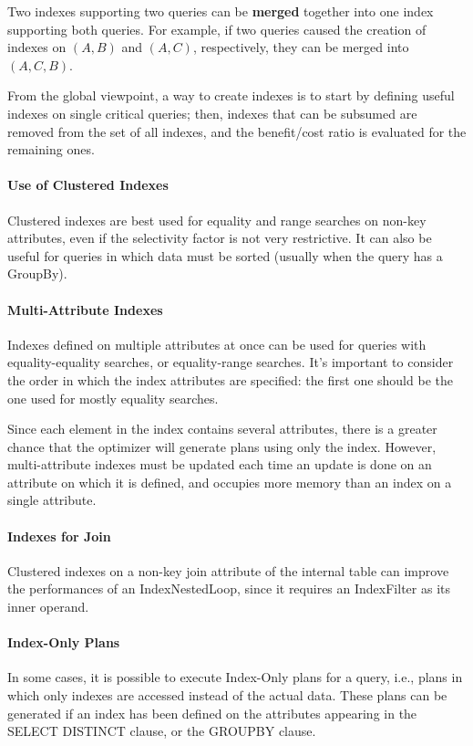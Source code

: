 Two indexes supporting two queries can be \textbf{merged} together into one index supporting both queries. For example, if two queries caused the creation of indexes on $(A, B)$ and $(A, C)$, respectively, they can be merged into $(A, C, B)$.

From the global viewpoint, a way to create indexes is to start by defining useful indexes on single critical queries; then, indexes that can be subsumed are removed from the set of all indexes, and the benefit/cost ratio is evaluated for the remaining ones.

\paragraph{Use of Clustered Indexes} Clustered indexes are best used for equality and range searches on non-key attributes, even if the selectivity factor is not very restrictive. It can also be useful for queries in which data must be sorted (usually when the query has a GroupBy).

\paragraph{Multi-Attribute Indexes} Indexes defined on multiple attributes at once can be used for queries with equality-equality searches, or equality-range searches. It's important to consider the order in which the index attributes are specified: the first one should be the one used for mostly equality searches.

Since each element in the index contains several attributes, there is a greater chance that the optimizer will generate plans using only the index. However, multi-attribute indexes must be updated each time an update is done on an attribute on which it is defined, and occupies more memory than an index on a single attribute.

\paragraph{Indexes for Join} Clustered indexes on a non-key join attribute of the internal table can improve the performances of an IndexNestedLoop, since it requires an IndexFilter as its inner operand.

\paragraph{Index-Only Plans} In some cases, it is possible to execute Index-Only plans for a query, i.e., plans in which only indexes are accessed instead of the actual data. These plans can be generated if an index has been defined on the attributes appearing in the SELECT DISTINCT clause, or the GROUPBY clause.

